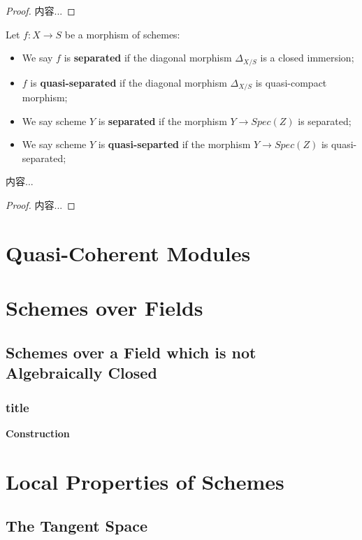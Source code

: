 \documentclass[Total.tex]{subfiles}
\begin{document}
			\begin{proof}
				内容...
			\end{proof}
			
			\begin{Def}
				Let $f:X\rightarrow S$ be a morphism of schemes:
				
				\begin{itemize}
					\item We say $f$ is \textbf{separated} if the diagonal morphism $\Delta_{X/S}$ is a closed immersion;
					\item $f$ is \textbf{quasi-separated} if the diagonal morphism $\Delta_{X/S}$ is quasi-compact morphism;
					\item We say scheme $Y$ is \textbf{separated} if the morphism $Y\rightarrow Spec(Z)$ is separated;
					\item We say scheme $Y$ is \textbf{quasi-separted} if the morphism $Y\rightarrow Spec(Z)$ is quasi-separated;
				\end{itemize}
			\end{Def}
			
			\begin{lemma}
				内容...
			\end{lemma}
			
			\begin{proof}
				内容...
			\end{proof}
			
		\section{Quasi-Coherent Modules}
		\section{Schemes over Fields}
			\subsection{Schemes over a Field which is not Algebraically Closed}
				\subsubsection{title}
				\textbf{Construction} 
				
		\section{Local Properties of Schemes}
			\subsection{The Tangent Space}
\end{document}
